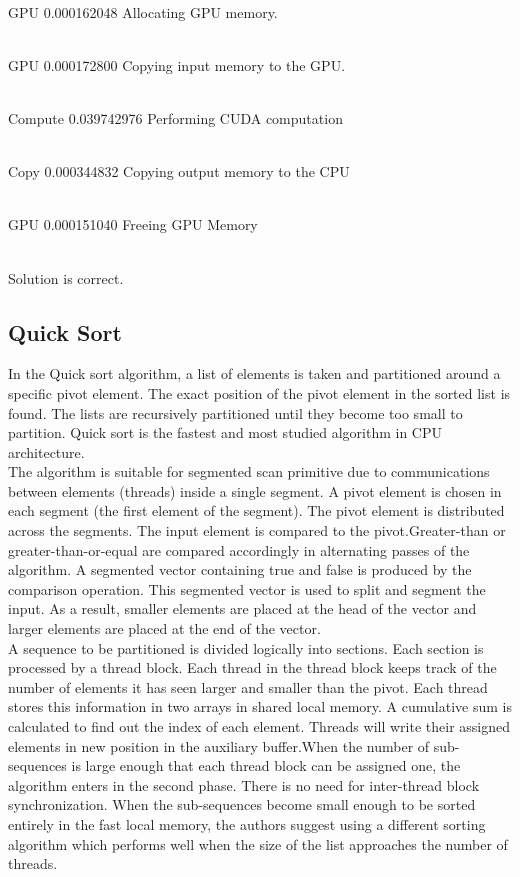 \documentclass[conference]{IEEEtran}
\begin{document}
\\ GPU     0.000162048 Allocating GPU memory.

\\ GPU     0.000172800 Copying input memory to the GPU.

\\ Compute 0.039742976 Performing CUDA computation

\\ Copy    0.000344832 Copying output memory to the CPU

\\ GPU    0.000151040 Freeing GPU Memory

\\ Solution is correct.

\subsection{Quick Sort}
In the Quick sort algorithm, a list of elements is taken and partitioned around a specific pivot element. The exact position of the pivot element in the sorted list is found. The lists are recursively partitioned until they become too small to partition. Quick sort is the fastest and most studied algorithm in CPU architecture.\\

The algorithm is suitable for segmented
scan primitive due to communications between elements (threads) inside a
single segment. A pivot element is chosen in each segment (the first element of the
segment). The pivot element is distributed across the segments. The input element is
compared to the pivot.Greater-than or greater-than-or-equal are compared accordingly
in alternating passes of the algorithm. A segmented vector containing true and false
is produced by the comparison operation. This segmented vector is used to split and segment the input. As a result, smaller elements are placed at the head of the vector
and larger elements are placed at the end of the vector. \\

A sequence to be partitioned is divided logically into sections. Each section is
processed by a thread block. Each thread in the thread block keeps track of the number
of elements it has seen larger and smaller than the pivot. Each thread stores this
information in two arrays in shared local memory. A cumulative sum is calculated to
find out the index of each element. Threads will write their assigned elements in new
position in the auxiliary buffer.When the number of sub-sequences is large enough that
each thread block can be assigned one, the algorithm enters in the second phase. There
is no need for inter-thread block synchronization. When the sub-sequences become
small enough to be sorted entirely in the fast local memory, the authors suggest using
a different sorting algorithm which performs well when the size of the list approaches
the number of threads.\\
\end{document}
